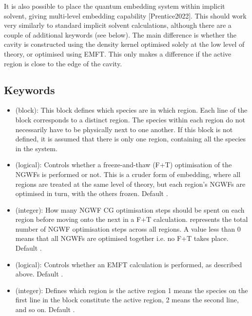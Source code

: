 \documentclass[letterpaper,10pt,english]{sphinxmanual}
\begin{document}
It is also possible to place the quantum embedding system within
implicit solvent, giving multi-level embedding
capability {[}Prentice2022{]}. This should work very
similarly to standard implicit solvent calculations, although there are
a couple of additional keywords (see below). The main difference is
whether the cavity is constructed using the density kernel optimised
solely at the low level of theory, or optimised using EMFT. This only
makes a difference if the active region is close to the edge of the
cavity.


\subsection{Keywords}
\label{\detokenize{EMFT_in_ONETEP:keywords}}\begin{itemize}
\item {} 
 (block): This block defines which species
are in which region. Each line of the block corresponds to a distinct
region. The species within each region do not necessarily have to be
physically next to one another. If this block is not defined, it is
assumed that there is only one region, containing all the species in
the system.

\item {} 
 (logical): Controls whether a freeze-and-thaw (F+T)
optimisation of the NGWFs is performed or not. This is a cruder form
of embedding, where all regions are treated at the same level of
theory, but each region’s NGWFs are optimised in turn, with the
others frozen. Default .

\item {} 
 (integer): How many NGWF CG optimisation
steps should be spent on each region before moving onto the next in a
F+T calculation.  represents the total number of
NGWF optimisation steps across all regions. A value less than 0 means
that all NGWFs are optimised together i.e. no F+T takes place.
Default .

\item {} 
 (logical): Controls whether an EMFT calculation is
performed, as described above. Default .

\item {} 
 (integer): Defines which region is the active
region \textendash{} 1 means the species on the first line in the
 block constitute the active region, 2 means
the second line, and so on. Default .


\end{itemize}
\end{document}
